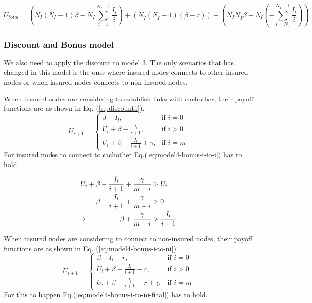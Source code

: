 \begin{equation}
U_{total}=(N_{I}(N_{I}-1)\beta-N_{I} \sum_{i=1}^{N_{I}-1} \frac{I_{l}}{i})+(N_{\overline{I}}(N_{\overline{I}}-1)(\beta-r))+(N_{I}N_{\overline{I}}\beta+N_{I}(-\sum_{i=N_{I}}^{N_{\overline{I}}-1}\frac{I_{l}}{i}))
\label{eq:model4-discount-total-payoff}
\end{equation}

\subsubsection{Discount and Bonus model}
We also need to apply the discount to model 3. The only scenarios that has changed in this model is the ones where insured nodes connects to other insured nodes or when insured nodes connects to non-insured nodes.

When insured nodes are considering to establish links with eachother, their payoff functions are as shown in Eq. (\ref{eq:discount1}).  
\begin{equation}
    U_{i+1}= 
\begin{cases}
    \beta - I_{l},& \text{if } i = 0\\
    U_{i}+\beta -\frac{I_{l}}{i+1},& \text{if }  i>0\\
    U_{i}+\beta -\frac{I_{l}}{i+1}+\gamma,& \text{if } i=m
\end{cases}
\label{eq:discount1}
\end{equation}
For insured nodes to connect to eachother Eq.(\ref{eq:model4-bonus-i-to-i}) has to hold.

\begin{eqnarray}
U_{i}+\beta-\frac{I_{l}}{i+1}+\frac{\gamma}{m-i}&>U_{i} \nonumber \\ 
\beta-\frac{I_{l}}{i+1}+\frac{\gamma}{m-i}&>0 \nonumber \\ 
\llap{$\rightarrow$\hspace{50pt}}\beta +\frac{\gamma}{m-i}&>\frac{I_{l}}{i+1}
\label{eq:model4-bonus-i-to-i}
\end{eqnarray}

When insured nodes are considering to connect to non-insured nodes, their payoff functions are as shown in Eq. (\ref{eq:model4-bonus-i-to-ni}).
\begin{equation}
U_{i+1}= 
\begin{cases}
    \beta - I_{l}-r,& \text{if } i = 0\\
    U_{i}+\beta -\frac{I_{l}}{i+1}-r,& \text{if }  i>0\\
    U_{i}+\beta -\frac{I_{l}}{i+1}-r+\gamma,& \text{if } i=m
\end{cases}
\label{eq:model4-bonus-i-to-ni}
\end{equation}
For this to happen Eq.(\ref{eq:model4-bonus-i-to-ni-final}) has to hold.

